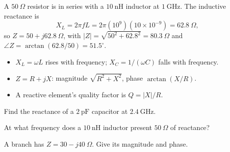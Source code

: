 \begin{workedexample}
A $50\ \Omega$ resistor is in series with a $10\ \text{nH}$ inductor at
$1\ \text{GHz}$. The inductive reactance is
\[ X_L = 2\pi f L = 2\pi(10^{9})(10\times10^{-9}) = 62.8\ \Omega, \]
so $Z = 50 + j62.8\ \Omega$, with $|Z| = \sqrt{50^2 + 62.8^2} = 80.3\ \Omega$ and
$\angle Z = \arctan(62.8/50) = 51.5^{\circ}$.
\end{workedexample}

\begin{keytakeaways}
\begin{itemize}[leftmargin=1.4em,itemsep=2pt]
\item $X_L = \omega L$ rises with frequency; $X_C = 1/(\omega C)$ falls with frequency.
\item $Z = R + jX$: magnitude $\sqrt{R^2 + X^2}$, phase $\arctan(X/R)$.
\item A reactive element's quality factor is $Q = |X|/R$.
\end{itemize}
\end{keytakeaways}

\begin{exercises}
\item Find the reactance of a $2\ \text{pF}$ capacitor at $2.4\ \text{GHz}$.
\item At what frequency does a $10\ \text{nH}$ inductor present $50\ \Omega$ of reactance?
\item A branch has $Z = 30 - j40\ \Omega$. Give its magnitude and phase.
\end{exercises}

